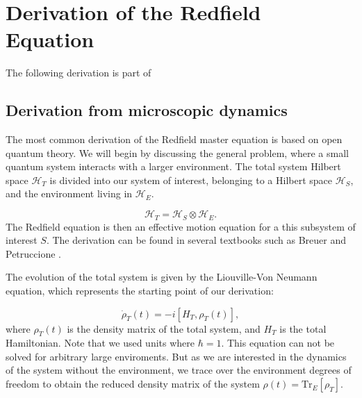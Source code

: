 \chapter{Derivation of the Redfield Equation} %
\label{Chapter:Derivation_Redfield_Equation} %

The following derivation is part of \cite{Manzano2020ShortIntroductionLindblad}

\section{Derivation from microscopic dynamics}
\label{sec:Derivation_redfield_eq_from_microscopic_dynamics}
The most common derivation of the Redfield master equation is based on open quantum theory.
We will begin by discussing the general problem, where a small quantum system interacts with a larger environment.
The total system Hilbert space $\mathcal{H}_T$ is divided into our system of interest, belonging to a Hilbert space $\mathcal{H}_S$, and the environment living in $\mathcal{H}_E$.

\begin{equation}
    \mathcal{H}_T = \mathcal{H}_S \otimes \mathcal{H}_E.
    \label{eq:Total_Hilbert_Space}
\end{equation}
The Redfield equation is then an effective motion equation for a this subsystem of interest $ S $.
The derivation can be found in several textbooks such as Breuer and Petruccione \cite{BreuerPetruccione2009TheoryOpenQuantum}.

The evolution of the total system is given by the Liouville-Von Neumann equation, which represents the starting point of our derivation:

\begin{equation}
    \dot{\rho}_T(t) = -i[H_T, \rho_T(t)],
    \label{eq:Von_Neumann_Equation}
\end{equation}
where $\rho_T(t)$ is the density matrix of the total system, and $H_T$ is the total Hamiltonian.
Note that we used units where $\hbar = 1$.
This equation can not be solved for arbitrary large enviroments.
But as we are interested in the dynamics of the system without the environment,
we trace over the environment degrees of freedom to obtain the reduced density matrix of the system
$\rho(t) = \mathrm{Tr}_E[\rho_T]$.

